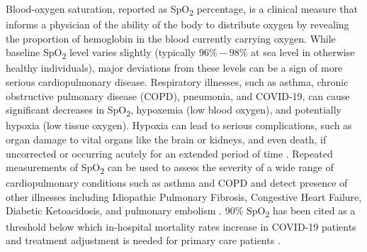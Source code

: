 \documentclass[12pt]{article}
\begin{document}
Blood-oxygen saturation, reported as SpO\textsubscript{2} percentage, is a clinical measure that informs a physician of the ability of the body to distribute oxygen by revealing the proportion of hemoglobin in the blood currently carrying oxygen.  While baseline SpO\textsubscript{2} level varies slightly (typically $96\%-98\%$ at sea level in otherwise healthy individuals), major deviations from these levels can be a sign of more serious cardiopulmonary disease.
Respiratory illnesses, such as asthma, chronic obstructive pulmonary disease (COPD), pneumonia, and COVID-19, can cause significant decreases in SpO\textsubscript{2}, hypoxemia (low blood oxygen), and potentially hypoxia (low tissue oxygen). Hypoxia can lead to serious complications, such as organ damage to vital organs like the brain or kidneys, and even death, if uncorrected or occurring acutely
for an extended period of time \cite{bickler2017effects}.
Repeated measurements of SpO\textsubscript{2} can be used to assess the severity of a wide range of cardiopulmonary conditions such as asthma and COPD \cite{siddiqui2018severity} 
and detect presence of other illnesses including Idiopathic Pulmonary Fibrosis, Congestive Heart Failure, Diabetic Ketoacidosis, and pulmonary embolism \cite{wilson2012diagnosis,kline2003use,zisman2007prediction}.
90\% SpO\textsubscript{2} has been cited as a threshold below which in-hospital mortality rates increase in COVID-19 patients \cite{xie2020association} and treatment adjustment is needed for primary care patients \cite{jones2003feasibility}.
\end{document}
